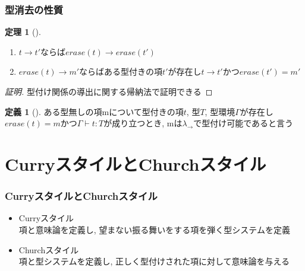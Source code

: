 \documentclass[dvipdfmx,cjk,xcolor=dvipsnames,envcountsect,notheorems,aspectratio=169]{beamer}
\theoremstyle{definition}
\newtheorem{definition}{定義}
\newtheorem{theorem}{定理}
\begin{document}
\begin{frame}
  \frametitle{型消去の性質}
  \renewcommand{\thetheorem}{9.5.2}
	\begin{theorem}[]
		\begin{enumerate}
			\item $t\longrightarrow t'$ならば$\textit{erase}(t)\longrightarrow \textit{erase}(t')$
			\item $\textit{erase}(t)\longrightarrow m'$ならばある型付きの項$t'$が存在し$t\longrightarrow t'$かつ$\textit{erase}(t')=m'$
		\end{enumerate}
	\end{theorem}
	\begin{proof}[証明]
		型付け関係の導出に関する帰納法で証明できる
	\end{proof}
	\renewcommand{\thedefinition}{9.5.3}
	\begin{definition}[]
		ある型無しの項mについて型付きの項$t$, 型$T$, 型環境$\Gamma$が存在し$\textit{erase}(t)=m$かつ$\Gamma \vdash t : T$が成り立つとき, mは$\lambda_\to$で型付け可能であると言う
	\end{definition}
\end{frame}

\section{CurryスタイルとChurchスタイル}

\begin{frame}
  \frametitle{CurryスタイルとChurchスタイル}
  \begin{itemize}\Large 
		\item Curryスタイル\\
			項と意味論を定義し, 望まない振る舞いをする項を弾く型システムを定義
		\item Churchスタイル\\
			項と型システムを定義し, 正しく型付けされた項に対して意味論を与える
	\end{itemize}
\end{frame}
\end{document}

